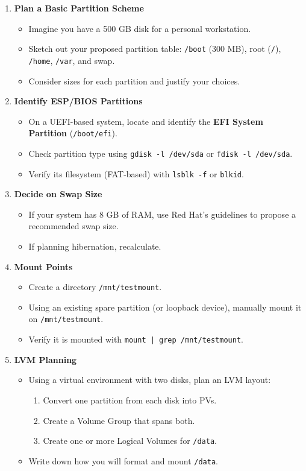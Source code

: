 \documentclass[12pt,a4paper]{report}
\begin{document}
\begin{enumerate}
    \item \textbf{Plan a Basic Partition Scheme}
    \begin{itemize}
        \item Imagine you have a 500 GB disk for a personal workstation.
        \item Sketch out your proposed partition table: \texttt{/boot} (300 MB), root (\texttt{/}), \texttt{/home}, \texttt{/var}, and swap.
        \item Consider sizes for each partition and justify your choices.
    \end{itemize}

    \item \textbf{Identify ESP/BIOS Partitions}
    \begin{itemize}
        \item On a UEFI-based system, locate and identify the \textbf{EFI System Partition} (\texttt{/boot/efi}).
        \item Check partition type using \texttt{gdisk -l /dev/sda} or \texttt{fdisk -l /dev/sda}.
        \item Verify its filesystem (FAT-based) with \texttt{lsblk -f} or \texttt{blkid}.
    \end{itemize}

    \item \textbf{Decide on Swap Size}
    \begin{itemize}
        \item If your system has 8 GB of RAM, use Red Hat’s guidelines to propose a recommended swap size.
        \item If planning hibernation, recalculate.
    \end{itemize}

    \item \textbf{Mount Points}
    \begin{itemize}
        \item Create a directory \texttt{/mnt/testmount}.
        \item Using an existing spare partition (or loopback device), manually mount it on \texttt{/mnt/testmount}.
        \item Verify it is mounted with \texttt{mount | grep /mnt/testmount}.
    \end{itemize}

    \item \textbf{LVM Planning}
    \begin{itemize}
        \item Using a virtual environment with two disks, plan an LVM layout:
        \begin{enumerate}
            \item Convert one partition from each disk into PVs.
            \item Create a Volume Group that spans both.
            \item Create one or more Logical Volumes for \texttt{/data}.
        \end{enumerate}
        \item Write down how you will format and mount \texttt{/data}.
    \end{itemize}


\end{enumerate}
\end{document}

